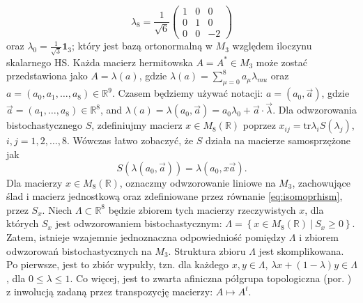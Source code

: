 {\begin{equation}
    \lambda_{8} = \frac{1}{\sqrt{6}} \begin{pmatrix}
            1 & 0 & 0 \\
            0 & 1 & 0 \\
            0 & 0 & -2
        \end{pmatrix}
\end{equation}
oraz $\lambda_{0} = \frac{1}{\sqrt{3}} \mathbf{1}_{3}$;
który jest bazą ortonormalną w $M_{3}$ względem iloczynu skalarnego HS.
Każda macierz hermitowska $A = A^{*} \in M_{3}$ może zostać przedstawiona
jako $A = \lambda(a)$, gdzie
$\lambda(a) = \sum_{\mu=0}^{8} a_{\mu} \lambda_{mu}$
oraz
$a = (a_{0}, a_{1}, \ldots, a_{8}) \in \mathbb{R}^{9}$.
Czasem będziemy używać notacji:
$a = (a_{0}, \vec{a})$,
gdzie $\vec{a} = (a_{1},\ldots,a_{8}) \in \mathbb{R}^{8}$,
and $\lambda(a) = \lambda(a_{0}, \vec{a}) = a_{0} \lambda_{0} + \vec{a} \cdot \vec{\lambda}$.
Dla odwzorowania bistochastycznego $S$,
zdefiniujmy macierz $x \in M_{8}(\mathbb{R})$ poprzez
$x_{ij} = \text{tr} \lambda_{i} S(\lambda_{j})$,
$i,j = 1,2,\ldots,8$.
Wówczas łatwo zobaczyć, że $S$ działa na macierze samosprzężone jak
\begin{equation}
\label{eq:isomoprhism}
S(\lambda(a_{0}, \vec{a})) = \lambda(a_{0}, x \vec{a}).
\end{equation}
Dla macierzy $x \in M_{8}(\mathbb{R})$,
oznaczmy odwzorowanie liniowe na $M_{3}$,
zachowujące ślad i macierz jednostkową
oraz zdefiniowane przez równanie \eqref{eq:isomoprhism},
przez $S_{x}$.
Niech $\Lambda \subset \mathbb{R}^{8}$ będzie zbiorem tych macierzy
rzeczywistych $x$,
dla których $S_{x}$ jest odwzorowaniem bistochastycznym:
$\Lambda = \left \{ x \in M_{8}(\mathbb{R}) \: |  \: S_{x} \geq 0 \right \}$.
Zatem, istnieje wzajemnie jednoznaczna odpowiedniość pomiędzy $\Lambda$
i zbiorem odwzorowań bistochastycznych na $M_{3}$.
Struktura zbioru $\Lambda$ jest skomplikowana.
Po pierwsze, jest to zbiór wypukły,
tzn. dla każdego $x,y \in \Lambda$,
$\lambda x + (1-\lambda)y \in \Lambda$,
dla $0 \leq \lambda \leq 1$.
Co więcej, jest to zwarta afiniczna półgrupa topologiczna
(por. \cite{schwarz1955hausdorff,chow1975compact})
z inwolucją zadaną przez transpozycję macierzy: $A \mapsto A^{t}$.

}
